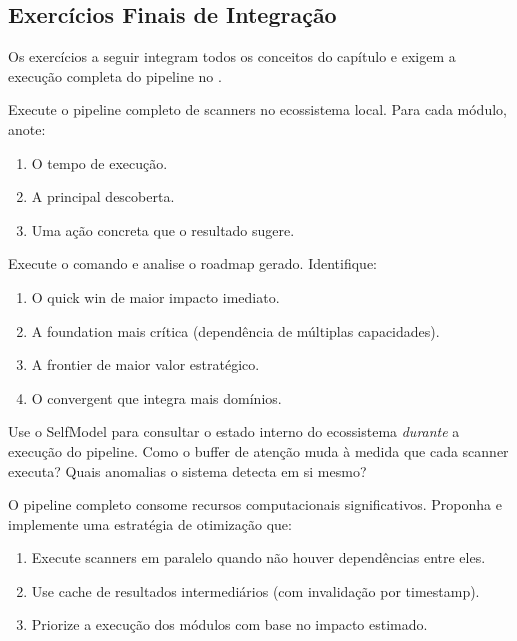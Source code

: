 \subsection{Exercícios Finais de Integração}

Os exercícios a seguir integram todos os conceitos do capítulo e
exigem a execução completa do pipeline no \opencodeeco{}.

\begin{exercicio}
Execute o pipeline completo de scanners no ecossistema local. Para cada
módulo, anote:
\begin{enumerate}
\item O tempo de execução.
\item A principal descoberta.
\item Uma ação concreta que o resultado sugere.
\end{enumerate}
\end{exercicio}

\begin{exercicio}
Execute o comando  e analise o roadmap gerado. Identifique:
\begin{enumerate}
\item O quick win de maior impacto imediato.
\item A foundation mais crítica (dependência de múltiplas capacidades).
\item A frontier de maior valor estratégico.
\item O convergent que integra mais domínios.
\end{enumerate}
\end{exercicio}

\begin{exercicio}
Use o SelfModel para consultar o estado interno do ecossistema \emph{durante}
a execução do pipeline. Como o buffer de atenção muda à medida que cada
scanner executa? Quais anomalias o sistema detecta em si mesmo?
\end{exercicio}

\begin{exercicio}
O pipeline completo consome recursos computacionais significativos.
Proponha e implemente uma estratégia de otimização que:
\begin{enumerate}
\item Execute scanners em paralelo quando não houver dependências entre eles.
\item Use cache de resultados intermediários (com invalidação por
timestamp).
\item Priorize a execução dos módulos com base no impacto estimado.
\end{enumerate}
\end{exercicio}

